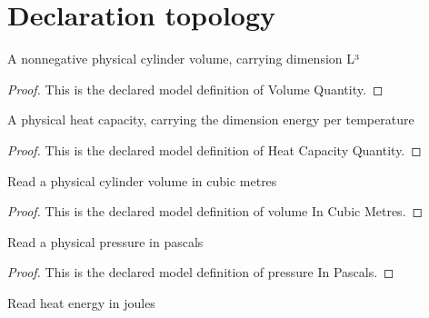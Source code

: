 \section{Declaration topology}
\begin{definition}
  \label{def:physics:phyx-mini-0437:phyxminiproblems-problemphyxmini0437-volumequantity}
  A nonnegative physical cylinder volume, carrying dimension L³
\end{definition}
\begin{proof}
  This is the declared model definition of Volume Quantity.
\end{proof}
\begin{definition}
  \label{def:physics:phyx-mini-0437:phyxminiproblems-problemphyxmini0437-heatcapacityquantity}
  A physical heat capacity, carrying the dimension energy per temperature
\end{definition}
\begin{proof}
  This is the declared model definition of Heat Capacity Quantity.
\end{proof}
\begin{definition}
  \label{def:physics:phyx-mini-0437:phyxminiproblems-problemphyxmini0437-volumeincubicmetres}
  Read a physical cylinder volume in cubic metres
\end{definition}
\begin{proof}
  This is the declared model definition of volume In Cubic Metres.
\end{proof}
\begin{definition}
  \label{def:physics:phyx-mini-0437:phyxminiproblems-problemphyxmini0437-pressureinpascals}
  Read a physical pressure in pascals
\end{definition}
\begin{proof}
  This is the declared model definition of pressure In Pascals.
\end{proof}
\begin{definition}
  \label{def:physics:phyx-mini-0437:phyxminiproblems-problemphyxmini0437-energyinjoules}
  Read heat energy in joules
\end{definition}
